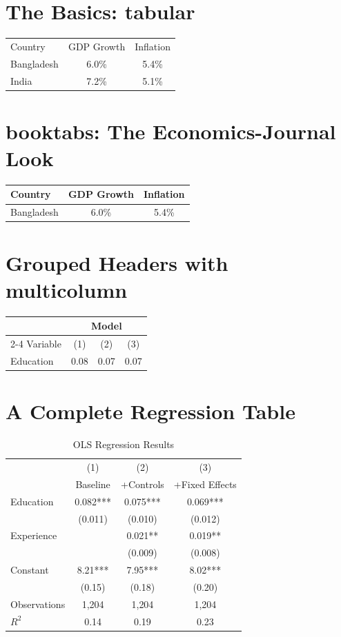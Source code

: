 \documentclass[11pt,a4paper]{article}
\begin{document}
\section*{The Basics: tabular}
\begin{tabular}{lcc}
  Country & GDP Growth & Inflation \\
  Bangladesh & 6.0\% & 5.4\% \\
  India & 7.2\% & 5.1\% \\
\end{tabular}

\bigskip
\section*{booktabs: The Economics-Journal Look}
\begin{tabular}{lcc}
  \toprule
  Country & GDP Growth & Inflation \\
  \midrule
  Bangladesh & 6.0\% & 5.4\% \\
  \bottomrule
\end{tabular}

\bigskip
\section*{Grouped Headers with multicolumn}
\begin{tabular}{lccc}
  \toprule
  & \multicolumn{3}{c}{Model} \\
  \cmidrule(lr){2-4}
  Variable & (1) & (2) & (3) \\
  \midrule
  Education & 0.08 & 0.07 & 0.07 \\
  \bottomrule
\end{tabular}

\section*{A Complete Regression Table}
\begin{table}[htbp]
\centering
\begin{tabular}{lccc}
  \toprule
   & (1) & (2) & (3) \\
   & Baseline & +Controls & +Fixed Effects \\
  \midrule
  Education & 0.082*** & 0.075*** & 0.069*** \\
   & (0.011) & (0.010) & (0.012) \\
  Experience & & 0.021** & 0.019** \\
   & & (0.009) & (0.008) \\
  Constant & 8.21*** & 7.95*** & 8.02*** \\
   & (0.15) & (0.18) & (0.20) \\
  \midrule
  Observations & 1{,}204 & 1{,}204 & 1{,}204 \\
  $R^2$ & 0.14 & 0.19 & 0.23 \\
  \bottomrule
\end{tabular}
\caption{OLS Regression Results}
\end{table}
\end{document}
